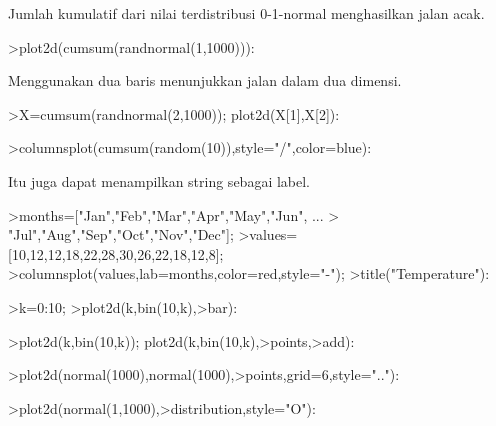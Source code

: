 \documentclass{article}
\begin{document}
\begin{eulernotebook}
\begin{eulercomment}
\begin{eulercomment}
\begin{eulercomment}
\begin{eulercomment}
\begin{eulercomment}
Jumlah kumulatif dari nilai terdistribusi 0-1-normal menghasilkan
jalan acak.
\end{eulercomment}
\begin{eulerprompt}
>plot2d(cumsum(randnormal(1,1000))):
\end{eulerprompt}
\begin{eulercomment}
Menggunakan dua baris menunjukkan jalan dalam dua dimensi.
\end{eulercomment}
\begin{eulerprompt}
>X=cumsum(randnormal(2,1000)); plot2d(X[1],X[2]):
\end{eulerprompt}
\begin{eulerprompt}
>columnsplot(cumsum(random(10)),style="/",color=blue):
\end{eulerprompt}
\begin{eulercomment}
Itu juga dapat menampilkan string sebagai label.
\end{eulercomment}
\begin{eulerprompt}
>months=["Jan","Feb","Mar","Apr","May","Jun", ...
>  "Jul","Aug","Sep","Oct","Nov","Dec"];
>values=[10,12,12,18,22,28,30,26,22,18,12,8];
>columnsplot(values,lab=months,color=red,style="-");
>title("Temperature"):
\end{eulerprompt}
\begin{eulerprompt}
>k=0:10;
>plot2d(k,bin(10,k),>bar):
\end{eulerprompt}
\begin{eulerprompt}
>plot2d(k,bin(10,k)); plot2d(k,bin(10,k),>points,>add):
\end{eulerprompt}
\begin{eulerprompt}
>plot2d(normal(1000),normal(1000),>points,grid=6,style=".."):
\end{eulerprompt}
\begin{eulerprompt}
>plot2d(normal(1,1000),>distribution,style="O"):
\end{eulerprompt}
\begin{eulerprompt}

\end{eulerprompt}
\end{eulercomment}
\end{eulercomment}
\end{eulercomment}
\end{eulercomment}
\end{eulernotebook}
\end{document}
